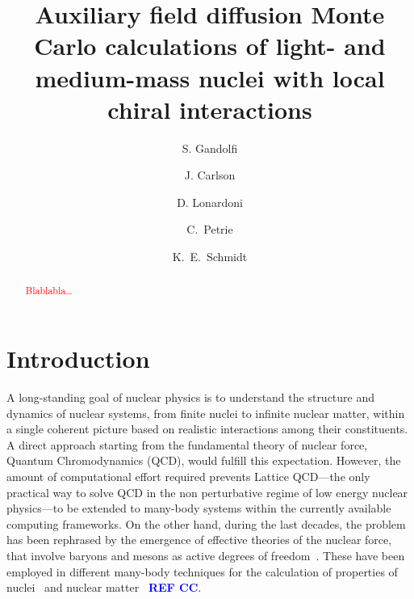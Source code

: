 \documentclass[aps,prc,twocolumn,superscriptaddress,showpacs,floatfix,nofootinbib]{revtex4-1}
\newcommand{\red}[1]{\protect\textcolor{red}{#1}}
\newcommand{\blue}[1]{\protect\textcolor{blue}{#1}}
\begin{document}
\title{Auxiliary field diffusion Monte Carlo calculations of light- and medium-mass nuclei with local chiral interactions}

\author{S. Gandolfi}
\author{J. Carlson}

\author{D. Lonardoni}

\author{C.~Petrie}
\author{K.~E.~Schmidt}

\begin{abstract}
\red{Blablabla\ldots}
\end{abstract}

\maketitle

\section{Introduction}
\label{sec:intro}
A long-standing goal of nuclear physics is to understand the structure and dynamics 
of nuclear systems, from finite nuclei to infinite nuclear matter, within a single 
coherent picture based on realistic interactions among their constituents.
A direct approach starting from the fundamental theory of nuclear force, Quantum Chromodynamics (QCD), 
would fulfill this expectation. However, the amount of computational effort required prevents 
Lattice QCD---the only practical way to solve QCD in the non perturbative regime of low energy 
nuclear physics---to be extended to many-body systems within the currently available computing frameworks.
On the other hand, during the last decades, the problem has been rephrased by the emergence of 
effective theories of the nuclear force, that involve baryons and mesons as active degrees of 
freedom~\cite{Wiringa:1995,Epelbaum:2009,Machleidt:2011,Ekstrom:2013,Gezerlis:2014,Entem:2015,
Epelbaum:2015,Ekstrom:2015,Piarulli:2015,Lynn:2016,Ekstrom:2017}. These have been 
employed in different many-body techniques for the calculation of properties of 
nuclei~\cite{Barrett:2013,Hagen:2013,Carlson:2015,Hergert:2015} 
and nuclear matter~\cite{Akmal:1998,Hebeler:2013,Carlson:2015}
\blue{\bf REF CC}.
\end{document}
